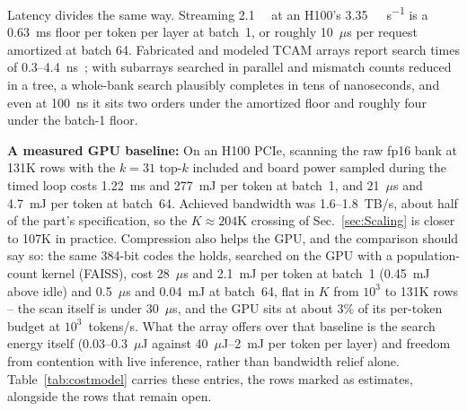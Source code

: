 Latency divides the same way. Streaming \qty{2.1}{\giga\byte} at an
H100's \qty{3.35}{\tera\byte\per\second} is a 0.63~ms floor per token
per layer at batch~1, or roughly 10~$\mu$s per request amortized at
batch 64. Fabricated and modeled TCAM arrays report search times of
0.3--4.4~ns~\cite{liu2022evacam,ni2019fetcam}; with subarrays searched
in parallel and mismatch counts reduced in a tree, a whole-bank search
plausibly completes in tens of nanoseconds, and even at 100~ns it sits
two orders under the amortized floor and roughly four under the
batch-1 floor.

\textbf{A measured GPU baseline:} On an H100 PCIe, scanning the raw
fp16 bank at 131K rows with the $k=31$ top-$k$ included and board
power sampled during the timed loop costs 1.22~ms and 277~mJ per token
at batch~1, and 21~$\mu$s and 4.7~mJ per token at batch~64. Achieved
bandwidth was 1.6--1.8~TB/s, about half of the part's specification,
so the $K\!\approx\!204$K crossing of Sec.~\ref{sec:Scaling} is
closer to 107K in practice. Compression also helps the GPU, and the
comparison should say so: the same 384-bit codes the \cam holds,
searched on the GPU with a population-count kernel (FAISS), cost
28~$\mu$s and 2.1~mJ per token at batch~1 (0.45~mJ above idle) and
0.5~$\mu$s and 0.04~mJ at batch~64, flat in $K$ from $10^{3}$ to 131K
rows -- the scan itself is under 30~$\mu$s, and the GPU sits at about
3\% of its per-token budget at $10^{3}$~tokens/s. What the array
offers over that baseline is the search energy itself
(0.03--0.3~$\mu$J against 40~$\mu$J--2~mJ per token per layer) and
freedom from contention with live inference, rather than bandwidth
relief alone. Table~\ref{tab:costmodel} carries these entries, the
\cam rows marked as estimates, alongside the rows that remain
open.

